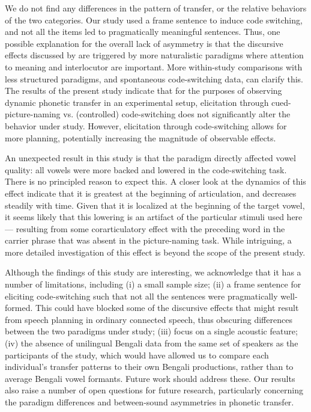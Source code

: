 \documentclass[12 pt]{article}
\begin{document}
We do not find any differences in the pattern of transfer, or the relative behaviors of the two categories. Our study used a frame sentence to induce code switching, and not all the items led to pragmatically meaningful sentences. Thus, one possible explanation for the overall lack of asymmetry is that the discursive effects discussed by \cite{olson2013bilingual} are triggered by more naturalistic paradigms where attention to meaning and interlocutor are important. More within-study comparisons with less structured paradigms, and spontaneous code-switching data, can clarify this. The results of the present study indicate that for the purposes of observing dynamic phonetic transfer in an experimental setup, elicitation through cued-picture-naming vs. (controlled) code-switching does not significantly alter the behavior under study. However, elicitation through code-switching allows for more planning, potentially increasing the magnitude of observable effects. 

An unexpected result in this study is that the paradigm directly affected vowel quality: all vowels were more backed and lowered in the code-switching task. There is no principled reason to expect this. A closer look at the dynamics of this effect indicate that it is greatest at the beginning of articulation, and decreases steadily with time. Given that it is localized at the beginning of the target vowel, it seems likely that this lowering is an artifact of the particular stimuli used here--- resulting from some corarticulatory effect with the preceding word in the carrier phrase that was absent in the picture-naming task. While intriguing, a more detailed investigation of this effect is beyond the scope of the present study.  

Although the findings of this study are interesting, we acknowledge that it has a number of limitations, including (i) a small sample size; (ii) a frame sentence for eliciting code-switching such that not all the sentences were pragmatically well-formed. This could have blocked some of the discursive effects that might result from speech planning in ordinary connected speech, thus obscuring differences between the two paradigms under study; (iii) focus on a single acoustic feature; (iv) the absence of unilingual Bengali data from the same set of speakers as the participants of the study, which would have allowed us to compare each individual's transfer patterns to their own Bengali productions, rather than to average Bengali vowel formants. Future work should address these. Our results also raise a number of open questions for future research, particularly concerning the paradigm differences and between-sound asymmetries in phonetic transfer.   
\end{document}
